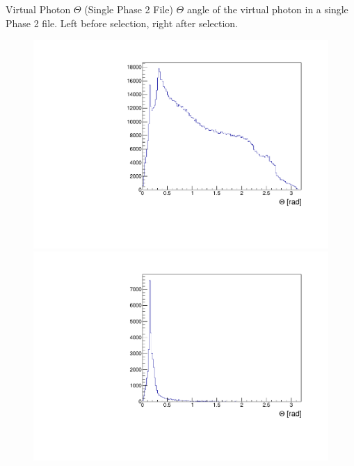\documentclass[10pt]{beamer}
\begin{document}
\begin{frame}{Virtual Photon $\Theta$ (Single Phase 2 File)}
	$\Theta$ angle of the virtual photon in a single Phase 2 file. Left before selection, right after selection.
	
	\begin{figure}
		\centering
		\begin{minipage}{.5\textwidth}
			\centering
			\includegraphics[width=\textwidth]{gg/data/Thetagg_BS}
			
		\end{minipage}%
		\begin{minipage}{.5\textwidth}
			\centering
			\includegraphics[width=\textwidth]{gg/data/Thetagg_AS}
			
		\end{minipage}
	\end{figure}
\end{frame}
\end{document}
